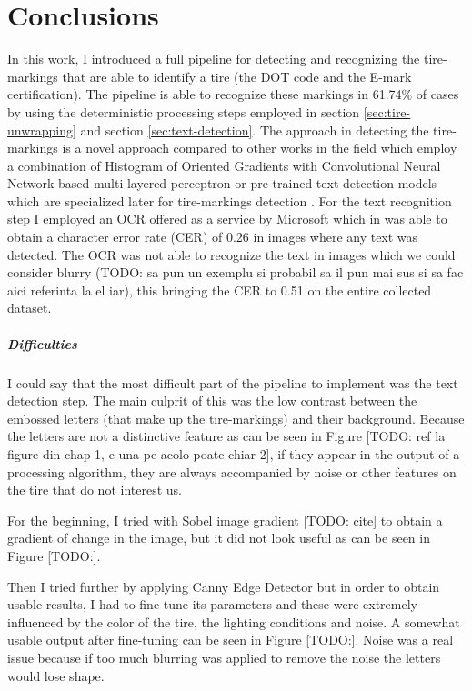 \chapter{Conclusions}\pagestyle{fancy}\setlength{\parindent}{3em}
\label{chap:conclusions}

In this work, I introduced a full pipeline for detecting and recognizing the tire-markings that are able to identify a tire (the DOT code and the E-mark certification). The pipeline is able to recognize these markings in 61.74\% of cases by using the deterministic processing steps employed in section \ref{sec:tire-unwrapping} and section \ref{sec:text-detection}. The approach in detecting the tire-markings is a novel approach compared to other works in the field which employ a combination of Histogram of Oriented Gradients with Convolutional Neural Network based multi-layered perceptron \cite{article:1} or pre-trained text detection models which are specialized later for tire-markings detection \cite{site:0}. For the text recognition step I employed an OCR offered as a service by Microsoft \cite{site:Microsoft_Cognitive_Services} which in was able to obtain a character error rate (CER) of 0.26 in images where any text was detected. The OCR was not able to recognize the text in images which we could consider blurry (TODO: sa pun un exemplu si probabil sa il pun mai sus si sa fac aici referinta la el iar), this bringing the CER to 0.51 on the entire collected dataset.

\paragraph{Difficulties}\mbox{}\par

I could say that the most difficult part of the pipeline to implement was the text detection step. The main culprit of this was the low contrast between the embossed letters (that make up the tire-markings) and their background. Because the letters are not a distinctive feature as can be seen in Figure [TODO: ref la figure din chap 1, e una pe acolo poate chiar 2], if they appear in the output of a processing algorithm, they are always accompanied by noise or other features on the tire that do not interest us.

For the beginning, I tried with Sobel image gradient [TODO: cite] to obtain a gradient of change in the image, but it did not look useful as can be seen in Figure [TODO:].

Then I tried further by applying Canny Edge Detector \cite{site:Canny_edge_detection} but in order to obtain usable results, I had to fine-tune its parameters and these were extremely influenced by the color of the tire, the lighting conditions and noise. A somewhat usable output after fine-tuning can be seen in Figure [TODO:]. Noise was a real issue because if too much blurring was applied to remove the noise the letters would lose shape.

